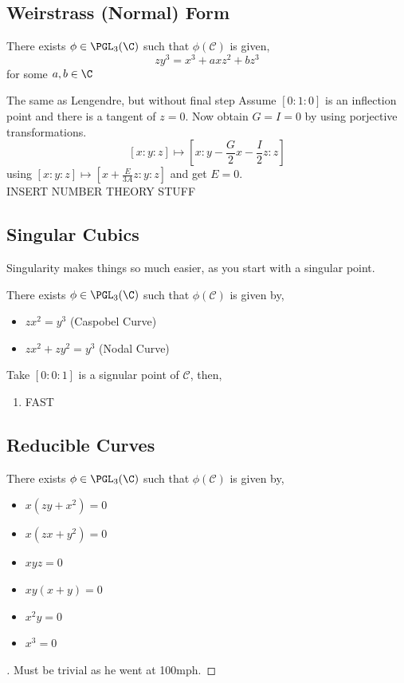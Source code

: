 \documentclass{article}
\begin{document}
\subsection{Weirstrass (Normal) Form}
\begin{nthm}
  There exists $\phi \in \PGL_3(\C)$ such that $\phi(\mathcal{C})$ is given,
  $$ zy^3 = x^3 + axz^2 + bz^3 $$
  for some $a, b \in \C$
\end{nthm}
The same as Lengendre, but without final step
Assume $[0 : 1 : 0]$ is an inflection point and there is a tangent of $z = 0$. Now obtain $G = I = 0$ by using porjective transformations.
$$ [x : y : z] \mapsto \left[ x : y - \frac{G}{2}x - \frac{I}{2}z : z \right] $$
using $[x : y : z] \mapsto \left[ x + \frac{E}{3A}z : y : z \right]$ and get $E = 0$.\\

INSERT NUMBER THEORY STUFF\\

\subsection{Singular Cubics}
Singularity makes things so much easier, as you start with a singular point.

\begin{nthm}[]
  There exists $\phi \in \PGL_3(\C)$ such that $\phi(\mathcal{C})$ is given by,
  \begin{itemize}
    \item $zx^2 = y^3$ (Caspobel Curve)
    \item $zx^2 + zy^2 = y^3$ (Nodal Curve)
  \end{itemize}
\end{nthm}

Take $[0 : 0 : 1]$ is a signular point of $\mathcal{C}$, then,
\begin{enumerate}
  \item FAST
\end{enumerate}

\subsection{Reducible Curves}
\begin{nthm}[]
  There exists $\phi \in \PGL_3(\C)$ such that $\phi(\mathcal{C})$ is given by,
  \begin{itemize}
    \item $x(zy + x^2) = 0$
    \item $x(zx + y^2)= 0$
    \item $xyz = 0$
    \item $xy(x + y) = 0$
    \item $x^2y = 0$
   \item  $x^3 = 0$
  \end{itemize}
\end{nthm}
\begin{proof}[]
  Must be trivial as he went at 100mph.
\end{proof}
\end{document}

